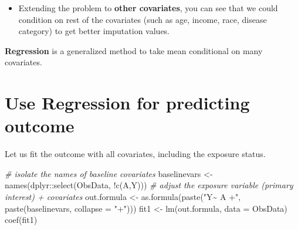 \documentclass[
]{book}
\newenvironment{Shaded}{\begin{snugshade}}{\end{snugshade}}
\newcommand{\AttributeTok}[1]{\textcolor[rgb]{0.77,0.63,0.00}{#1}}
\newcommand{\CommentTok}[1]{\textcolor[rgb]{0.56,0.35,0.01}{\textit{#1}}}
\newcommand{\FunctionTok}[1]{\textcolor[rgb]{0.00,0.00,0.00}{#1}}
\newcommand{\NormalTok}[1]{#1}
\newcommand{\OtherTok}[1]{\textcolor[rgb]{0.56,0.35,0.01}{#1}}
\newcommand{\SpecialCharTok}[1]{\textcolor[rgb]{0.00,0.00,0.00}{#1}}
\newcommand{\StringTok}[1]{\textcolor[rgb]{0.31,0.60,0.02}{#1}}
\providecommand{\tightlist}{%
  \setlength{\itemsep}{0pt}\setlength{\parskip}{0pt}}
\begin{document}
\begin{itemize}
\tightlist
\item
  Extending the problem to \textbf{other covariates}, you can see that we could condition on rest of the covariates (such as age, income, race, disease category) to get better imputation values.
\end{itemize}

\begin{rmdcomment}
\textbf{Regression} is a generalized method to take mean conditional on
many covariates.
\end{rmdcomment}

\hypertarget{use-regression-for-predicting-outcome}{%
\section{Use Regression for predicting outcome}\label{use-regression-for-predicting-outcome}}

Let us fit the outcome with all covariates, including the exposure status.

\begin{Shaded}
\begin{Highlighting}[]
\CommentTok{\# isolate the names of baseline covariates}
\NormalTok{baselinevars }\OtherTok{\textless{}{-}} \FunctionTok{names}\NormalTok{(dplyr}\SpecialCharTok{::}\FunctionTok{select}\NormalTok{(ObsData, }\SpecialCharTok{!}\FunctionTok{c}\NormalTok{(A,Y)))}
\CommentTok{\# adjust the exposure variable (primary interest) + covariates}
\NormalTok{out.formula }\OtherTok{\textless{}{-}} \FunctionTok{as.formula}\NormalTok{(}\FunctionTok{paste}\NormalTok{(}\StringTok{"Y\textasciitilde{} A +"}\NormalTok{, }
                               \FunctionTok{paste}\NormalTok{(baselinevars, }
                                     \AttributeTok{collapse =} \StringTok{"+"}\NormalTok{)))}
\NormalTok{fit1 }\OtherTok{\textless{}{-}} \FunctionTok{lm}\NormalTok{(out.formula, }\AttributeTok{data =}\NormalTok{ ObsData)}
\FunctionTok{coef}\NormalTok{(fit1)}
\end{Highlighting}
\end{Shaded}
\end{document}
